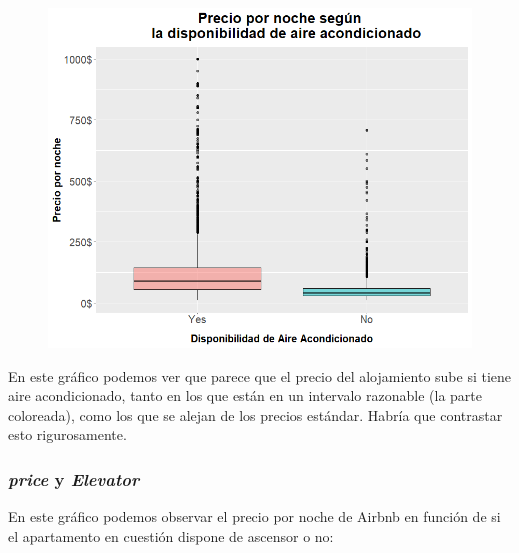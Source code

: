 \documentclass{article}
\begin{document}
\vspace{0.35cm}
\begin{figure}[h]
\hspace*{-0.15cm}
\centering
\includegraphics[scale = 0.6]{boxplot_precio_air_conditioning}
\end{figure}
\vspace{0.15cm}

En este gráfico podemos ver que parece que el precio del alojamiento sube si tiene aire acondicionado, tanto en los que están en un intervalo razonable (la parte coloreada), como los que se alejan de los precios estándar. Habría que contrastar esto rigurosamente.

\clearpage
\subsubsection{\emph{price} y \emph{Elevator}}

En este gráfico podemos observar el precio por noche de Airbnb en función de si el apartamento en cuestión dispone de ascensor o no:
\end{document}

